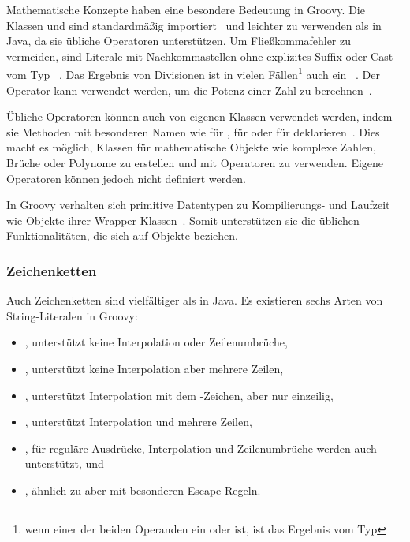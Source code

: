 	Mathematische Konzepte haben eine besondere Bedeutung in Groovy.
	Die Klassen  und  sind standardmäßig importiert~\cite[{Abs.} 1.]{groovy-lang:differences} und leichter zu verwenden als in Java, da sie übliche Operatoren unterstützen.
	Um Fließkommafehler zu vermeiden, sind Literale mit Nachkommastellen ohne explizites Suffix oder Cast vom Typ ~\cite[{Abs.} 5.2.]{groovy-lang:syntax}.
	Das Ergebnis von Divisionen ist in vielen Fällen\footnote{wenn einer der beiden Operanden ein  oder  ist, ist das Ergebnis vom Typ } auch ein ~\cite[{Abs.} 5.5.1.]{groovy-lang:syntax}.
	Der Operator \code{**} kann verwendet werden, um die Potenz einer Zahl zu berechnen~\cite[{Abs.} 5.5.2.]{groovy-lang:syntax}.

	Übliche Operatoren können auch von eigenen Klassen verwendet werden, indem sie Methoden mit besonderen Namen wie  für \code{+},  für \code{<<} oder  für \code{++} deklarieren~\cite[{Abs.} 10.]{groovy-lang:operators}.
	Dies macht es möglich, Klassen für mathematische Objekte wie komplexe Zahlen, Brüche oder Polynome zu erstellen und mit Operatoren zu verwenden.
	Eigene Operatoren können jedoch nicht definiert werden.

	In Groovy verhalten sich primitive Datentypen zu Kompilierungs- und Laufzeit wie Objekte ihrer Wrapper-Klassen~\cite[{Abs.} 10.]{groovy-lang:differences}.
	Somit unterstützen sie die üblichen Funktionalitäten, die sich auf Objekte beziehen.

	\subsubsection{Zeichenketten}\label{subsubsec:strings}

	Auch Zeichenketten sind vielfältiger als in Java.
	Es existieren sechs Arten von String-Literalen in Groovy:

	\begin{itemize}
		\item {}, unterstützt keine Interpolation oder Zeilenumbrüche,
		\item {}, unterstützt keine Interpolation aber mehrere Zeilen,
		\item {}, unterstützt Interpolation mit dem \code{$}-Zeichen, aber nur einzeilig,
		\item {}, unterstützt Interpolation und mehrere Zeilen,
		\item {}, für reguläre Ausdrücke, Interpolation und Zeilenumbrüche werden auch unterstützt, und
		\item {}, ähnlich zu  aber mit besonderen Escape-Regeln.
	\end{itemize}

